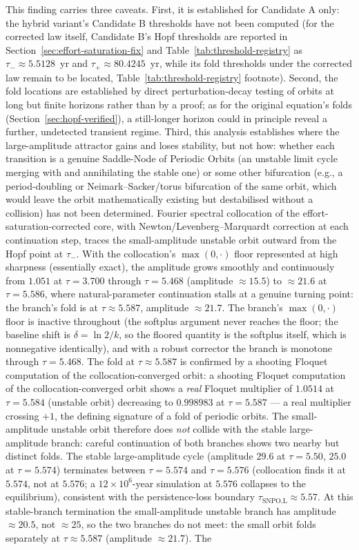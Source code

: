 \documentclass[twocolumn,10pt]{article}
\begin{document}
This finding carries three caveats. First, it is established for Candidate A only: the hybrid variant's Candidate B thresholds have not been computed (for the corrected law itself, Candidate B's Hopf thresholds are reported in Section~\ref{sec:effort-saturation-fix} and Table~\ref{tab:threshold-registry} as $\tau_-\approx5.5128$~yr and $\tau_+\approx80.4245$~yr, while its fold thresholds under the corrected law remain to be located, Table~\ref{tab:threshold-registry} footnote). Second, the fold locations are established by direct perturbation-decay testing of orbits at long but finite horizons rather than by a proof; as for the original equation's folds (Section~\ref{sec:hopf-verified}), a still-longer horizon could in principle reveal a further, undetected transient regime. Third, this analysis establishes where the large-amplitude attractor gains and loses stability, but not how: whether each transition is a genuine Saddle-Node of Periodic Orbits (an unstable limit cycle merging with and annihilating the stable one) or some other bifurcation (e.g., a period-doubling or Neimark--Sacker/torus bifurcation of the same orbit, which would leave the orbit mathematically existing but destabilised without a collision) has not been determined. Fourier spectral collocation of the effort-saturation-corrected core, with Newton/Levenberg--Marquardt correction at each continuation step, traces the small-amplitude unstable orbit outward from the Hopf point at $\tau_-$. With the collocation's $\max(0,\cdot)$ floor represented at high sharpness (essentially exact), the amplitude grows smoothly and continuously from $1.051$ at $\tau=3.700$ through $\tau=5.468$ (amplitude $\approx15.5$) to $\approx21.6$ at $\tau=5.586$, where natural-parameter continuation stalls at a genuine turning point: the branch's fold is at $\tau\approx5.587$, amplitude $\approx21.7$. The branch's $\max(0,\cdot)$ floor is inactive throughout (the softplus argument never reaches the floor; the baseline shift is $\delta=\ln 2/k$, so the floored quantity is the softplus itself, which is nonnegative identically), and with a robust corrector the branch is monotone through $\tau=5.468$. The fold at $\tau\approx5.587$ is confirmed by a shooting Floquet computation of the collocation-converged orbit: a shooting Floquet computation of the collocation-converged orbit shows a \emph{real} Floquet multiplier of $1.0514$ at $\tau=5.584$ (unstable orbit) decreasing to $0.998983$ at $\tau=5.587$ --- a real multiplier crossing $+1$, the defining signature of a fold of periodic orbits. The small-amplitude unstable orbit therefore does \emph{not} collide with the stable large-amplitude branch: careful continuation of both branches shows two nearby but distinct folds. The stable large-amplitude cycle (amplitude $29.6$ at $\tau=5.50$, $25.0$ at $\tau=5.574$) terminates between $\tau=5.574$ and $\tau=5.576$ (collocation finds it at $5.574$, not at $5.576$; a $12\times10^6$-year simulation at $5.576$ collapses to the equilibrium), consistent with the persistence-loss boundary $\tau_{\text{SNPO,L}}\approx5.57$. At this stable-branch termination the small-amplitude unstable branch has amplitude $\approx20.5$, not $\approx25$, so the two branches do not meet: the small orbit folds separately at $\tau\approx5.587$ (amplitude $\approx21.7$). The 
\end{document}
